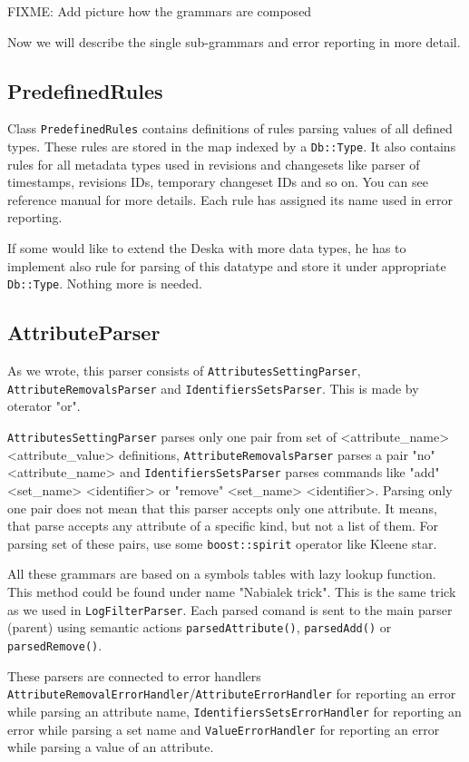 \documentclass[deska]{subfiles}
\begin{document}
FIXME: Add picture how the grammars are composed

Now we will describe the single sub-grammars and error reporting in more detail.

\subsection{PredefinedRules}

Class {\tt PredefinedRules} contains definitions of rules parsing values of all defined types. These rules are stored
in the map indexed by a {\tt Db::Type}. It also contains rules for all metadata types used in revisions and changesets
like parser of timestamps, revisions IDs, temporary changeset IDs and so on. You can see reference manual for more details.
Each rule has assigned its name used in error reporting.

If some would like to extend the Deska with more data types, he has to implement also rule for parsing of this datatype
and store it under appropriate {\tt Db::Type}. Nothing more is needed.

\subsection{AttributeParser}

As we wrote, this parser consists of {\tt AttributesSettingParser}, {\tt AttributeRemovalsParser} and {\tt IdentifiersSetsParser}.
This is made by oterator "or".

{\tt AttributesSettingParser} parses only one pair from set of <attribute\_name> <attribute\_value> definitions, {\tt AttributeRemovalsParser}
parses a pair "no" <attribute\_name> and {\tt IdentifiersSetsParser} parses commands like "add" <set\_name> <identifier> or
"remove" <set\_name> <identifier>. Parsing only one pair does not mean that this parser accepts only
one attribute. It means, that parse accepts any attribute of a specific kind, but not a list of them.
For parsing set of these pairs, use some {\tt boost::spirit} operator like Kleene star.

All these grammars are based on a symbols tables with lazy lookup function. This method could be found
under name "Nabialek trick". This is the same trick as we used in {\tt LogFilterParser}. Each parsed comand is sent to the
main parser (parent) using semantic actions {\tt parsedAttribute()}, {\tt parsedAdd()} or {\tt parsedRemove()}.

These parsers are connected to error handlers {\tt AttributeRemovalErrorHandler}/{\tt AttributeErrorHandler} for reporting an error
while parsing an attribute name, {\tt IdentifiersSetsErrorHandler} for reporting an error while parsing a set name and
{\tt ValueErrorHandler} for reporting an error while parsing a value of an attribute.
\end{document}
